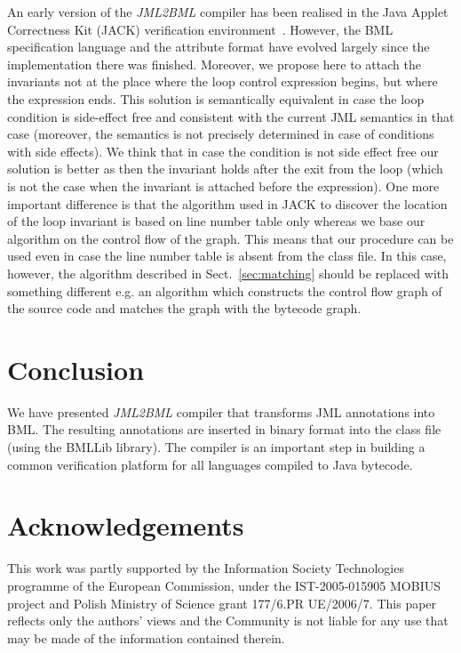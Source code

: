 \documentclass{llncs}
\newcommand{\jmltobmltext}{JML2BML}
\newcommand{\jmltobml}{\textsl{\jmltobmltext}\xspace}
\newcommand{\bmllib}{BMLLib\xspace}
\begin{document}
An early version of the \jmltobml compiler has been realised in the
Java Applet Correctness Kit (JACK) verification
environment~\cite{Jack}.  However, the BML specification language and the
attribute format have evolved largely since the implementation there
was finished. Moreover, we propose here to attach the invariants not at
the place where the loop control expression begins, but where the
expression ends. This solution is semantically equivalent in case the
loop condition is side-effect free and consistent with the current JML
semantics in that case \cite[Section 12.2.1]{jmlrefman} (moreover, the
semantics is not precisely determined in case of conditions with side
effects). We think that in case the condition is not side effect free
our solution is better as then the invariant holds after the exit from
the loop (which is not the case when the invariant is attached before
the expression). One more important difference is that the algorithm
used in JACK to discover the location of the loop invariant is based
on line number table only whereas we base our algorithm on the control
flow of the graph. This means that our procedure can be used even in
case the line number table is absent from the class file. In this
case, however, the algorithm described in Sect.~\ref{sec:matching}
should be replaced with something different e.g. an algorithm which
constructs the control flow graph of the source code and matches the
graph with the bytecode graph.

\vspace{-0.5\baselineskip}

\section{Conclusion}
\label{sec:conclusion}

\vspace{-0.5\baselineskip}

We have presented \jmltobml compiler that transforms JML
annotations into BML. The resulting annotations
are inserted in binary format into the class file (using the
\bmllib library). The compiler is an important step in
building a common verification platform for all languages compiled to
Java bytecode.

\vspace{-0.5\baselineskip}

\section{Acknowledgements} 

\vspace{-0.5\baselineskip}

This work was partly supported by the Information Society Technologies
programme of the European Commission, under the IST-2005-015905 MOBIUS
project and Polish Ministry of Science grant 177/6.PR UE/2006/7. This
paper reflects only the authors' views and the Community is not liable
for any use that may be made of the information contained therein.


\end{document}
